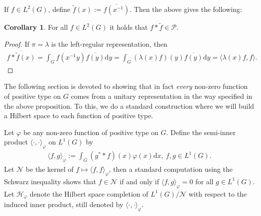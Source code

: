 \documentclass[10pt,twoside,openany,final]{memoir}
\theoremstyle{definition}
\newtheorem{corollary}[theorem]{Corollary}
\theoremstyle{Break}
\renewcommand{\H}{\mathcal{H}}
\renewcommand{\d}{\mathrm{d}}
\begin{document}
If $f \in L^2(G)$, define $\tilde{f}(x):=\overline{f(x^{-1})}$. Then the above gives the following:
\begin{corollary}
	For all $f \in L^2(G)$ it holds that $f \ast \tilde{f} \in \mathcal{P}$.
	\label{3.16}
\end{corollary}
\begin{proof}
	If $\pi=\lambda$ is the left-regular representation, then 
	\begin{align*}
		\overline{f \ast \tilde{f}(x)}=\int_{G}f(x^{-1}y) \overline{f(y)} \d y =  \int_G (\lambda(x) f)(y) \overline{f(y)} \d y = \langle \lambda(x)f,f\rangle.
	\end{align*}
\end{proof}
The following section is devoted to showing that in fact \textit{every} non-zero function of positive type on $G$ comes from a unitary representation in the way specified in the above proposition. To this, we do a standard construction where we will build a Hilbert space to each function of positive type.

Let $\varphi$ be any non-zero function of positive type on $G$. Define the semi-inner product $\langle \cdot , \cdot \rangle_\varphi$ on $L^1(G)$ by
\begin{align}
	\langle f,g \rangle_\varphi:= \int_G (g^* \ast f)(x) \varphi(x) \d x, \ f,g \in L^1(G).
	\label{3.17}
\end{align}
Let $\mathcal{N}$ be the kernel of $f \mapsto \langle f,f \rangle_\varphi$, then a standard computation using the Schwarz inequality shows that $f \in \mathcal{N}$ if and only if $\langle f,g \rangle_\varphi=0$ for all $g \in L^1(G)$. Let $\H_\varphi$ denote the Hilbert space completion of $L^1(G)/\mathcal{N}$ with respect to the induced inner product, still denoted by $\langle \cdot,\cdot\rangle_\varphi$.
\end{document}
